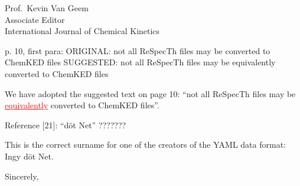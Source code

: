 \documentclass[11pt]{OSUletter}
\newcommand{\addtwo}[1]{{\sloppy\textcolor{red}{\uline{#1}}}}  %
\begin{document}
\begin{letter}{
               Prof.~Kevin Van Geem\\
               Associate Editor\\
               International Journal of Chemical Kinetics
               }
\begin{quoting}
    p. 10, first para:
    ORIGINAL:
    not all ReSpecTh files may be converted to ChemKED files
    SUGGESTED:
    not all ReSpecTh files may be equivalently converted to ChemKED files
\end{quoting}

We have adopted the suggested text on page 10:
``not all ReSpecTh files may be \addtwo{equivalently} converted to ChemKED files''.

\begin{quoting}
    Reference [21]:
    ``döt Net''   ???????
\end{quoting}

This is the correct surname for one of the creators of the YAML data format: Ingy döt Net.


\closing{Sincerely,}




\end{letter}
\end{document}
